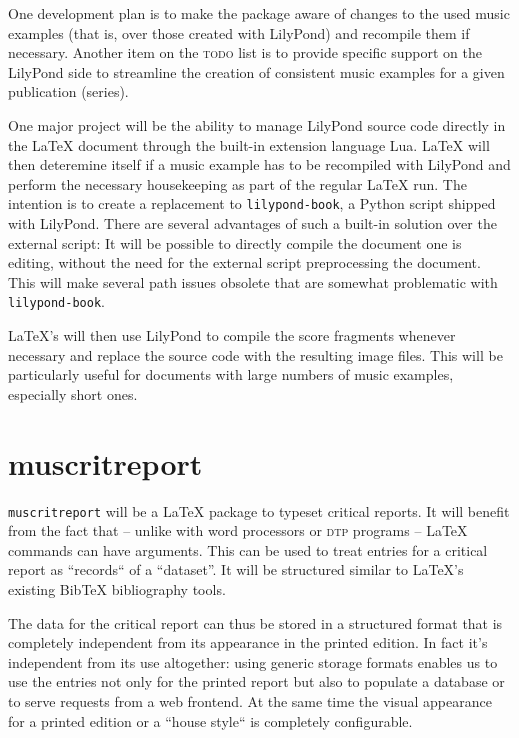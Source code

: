 \documentclass[oneside]{OLLbook}
\begin{document}
One development plan is to make the package aware of changes to the used music examples (that is, over those created with LilyPond) and recompile them if necessary.
Another item on the \textsc{todo} list is to provide specific support on the LilyPond side to streamline the creation of consistent music examples for a given publication (series).

One major project will be the ability to manage LilyPond source code directly in the \LaTeX{} document through the built-in extension language Lua.
\LaTeX{} will then deteremine itself if a music example has to be recompiled with LilyPond and perform the necessary housekeeping as part of the regular \LaTeX{} run.
The intention is to create a replacement to \texttt{lilypond-book}, a Python script shipped with LilyPond.
There are several advantages of such a built-in solution over the external script:
It will be possible to directly compile the document one is editing, without the need for the external script preprocessing the document.
This will make several path issues obsolete that are somewhat problematic with \texttt{lilypond-book}.

\LaTeX's will then use LilyPond to compile the score fragments whenever necessary and replace the source code with the resulting image files.
This will be particularly useful for documents with large numbers of music examples, especially short ones.


\section{muscritreport}
\label{sec:muscritreport}
\texttt{muscritreport} will be a \LaTeX{} package to typeset critical reports.
It will benefit from the fact that -- unlike with word processors or \textsc{dtp} programs -- \LaTeX{} commands can have arguments.
This can be used to treat entries for a critical report as “records“ of a “dataset”.
It will be structured similar to \LaTeX's existing BibTeX bibliography tools.

The data for the critical report can thus be stored in a structured format that is completely independent from its appearance in the printed edition.
In fact it's independent from its use altogether: using generic storage formats enables us to use the entries not only for the printed report but also to populate a database or to serve requests from a web frontend.
At the same time the visual appearance for a printed edition or a “house style“ is completely configurable.
\end{document}
